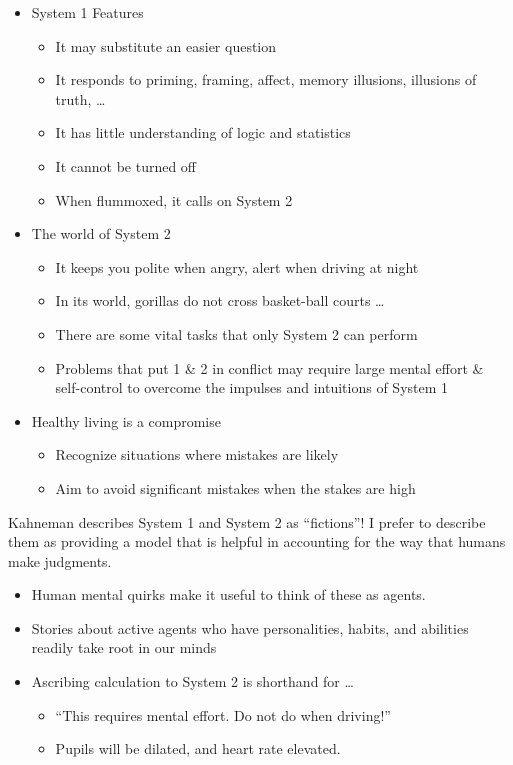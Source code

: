 \documentclass[
  10pt,
  b5paper]{book}
\providecommand{\tightlist}{%
  \setlength{\itemsep}{0pt}\setlength{\parskip}{0pt}}
\begin{document}
\begin{itemize}
\tightlist
\item
  System 1 Features

  \begin{itemize}
  \tightlist
  \item
    It may substitute an easier question
  \item
    It responds to priming, framing, affect, memory illusions,
    illusions of truth, \ldots{}
  \item
    It has little understanding of logic and statistics
  \item
    It cannot be turned off
  \item
    When flummoxed, it calls on System 2
  \end{itemize}
\item
  The world of System 2

  \begin{itemize}
  \tightlist
  \item
    It keeps you polite when angry, alert when driving at night
  \item
    In its world, gorillas do not cross basket-ball courts \ldots{}
  \item
    There are some vital tasks that only System 2 can perform
  \item
    Problems that put 1 \& 2 in conflict may require large
    mental effort \& self-control to overcome the impulses and
    intuitions of System 1
  \end{itemize}
\item
  Healthy living is a compromise

  \begin{itemize}
  \tightlist
  \item
    Recognize situations where mistakes are likely
  \item
    Aim to avoid significant mistakes when the stakes are high
  \end{itemize}
\end{itemize}

Kahneman describes System 1 and System 2 as ``fictions''! I prefer
to describe them as providing a model that is helpful in
accounting for the way that humans make judgments.

\begin{itemize}
\tightlist
\item
  Human mental quirks make it useful to think of these as agents.
\item
  Stories about active agents who have personalities, habits, and
  abilities readily take root in our minds
\item
  Ascribing calculation to System 2 is shorthand for \ldots{}

  \begin{itemize}
  \tightlist
  \item
    ``This requires mental effort. Do not do when driving!''
  \item
    Pupils will be dilated, and heart rate elevated.
  \end{itemize}
\end{itemize}
\end{document}
